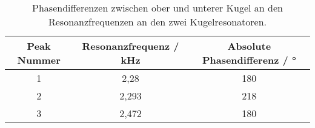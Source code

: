 \begin{table}[!htp]
    \centering
    \caption{Phasendifferenzen zwischen ober und unterer Kugel an den Resonanzfrequenzen an den zwei Kugelresonatoren.}
    \label{tab:phasediff}
    \begin{tabular}{c c c}
    \toprule
    {Peak Nummer} & {Resonanzfrequenz / kHz} & {Absolute Phasendifferenz / °}\\
    \midrule 
    1  & 2,28 & 180\\ 
    2  & 2,293 & 218   \\
    3  & 2,472 &180  \\
    \bottomrule
    \end{tabular}
    \end{table}